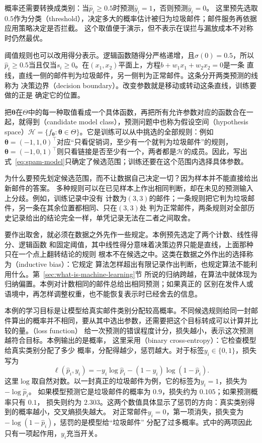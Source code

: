 概率还需要转换成类别：当$\hat{p}_i\geq 0.5$时预测$\hat{y}_i=1$，否则预测$\hat{y}_i=0$。
这里预先选取$0.5$作为分类（threshold），决定多大的概率估计被归为垃圾邮件；邮件服务再依据应用策略决定是否拦截。
这个取值便于演示，但不表示在误拦与漏放成本不对称时仍然最优。

阈值规则也可以改用得分表示。逻辑函数随得分严格递增，且$\sigma(0)=0.5$，所以
$\hat{p}_i\geq 0.5$当且仅当$s_i\geq 0$。在$(x_1,x_2)$平面上，方程$b+w_1x_1+w_2x_2=0$是一条
直线，直线一侧的邮件判为垃圾邮件，另一侧判为正常邮件。这条分开两类预测的线称为
决策边界（decision boundary）。改变参数就是移动或转动这条直线，训练要做的正是
确定它的位置。

把$\bm{\theta}$在$\Theta$中的每一种取值看成一个具体函数，再把所有允许参数对应的函数合在一起，就得到（candidate model class），预测问题中也称为假设空间（hypothesis space）$\mathcal{H}=\{f_{\bm{\theta}}:\bm{\theta}\in\Theta\}$。它是训练可以从中挑选的全部规则：例如$\bm{\theta}=(-1,1,0)^{\top}$对应“只看促销词，至少有一个就判为垃圾邮件”的规则，$\bm{\theta}=(-1,0,1)^{\top}$则只看链接是否至少有一个，两者都是$\mathcal{H}$的成员。因此，写出式~\eqref{eq:spam-model}只确定了候选范围；训练还要在这个范围内选择具体参数。

为什么要预先划定候选范围，而不让数据自己决定一切？因为样本并不能直接给出新邮件的答案。
多种规则可以在已见样本上作出相同判断，却在未见的预测输入上分歧。例如，训练记录中没有
计数为$(3,3)$的邮件；一条规则把它判为垃圾邮件，另一条在其余位置都相同、只在$(3,3)$处
判为正常邮件，两条规则对全部历史记录给出的结论完全一样，单凭记录无法在二者之间取舍。

要作出取舍，就必须在数据之外先作一些规定。本例预先选定了两个计数、线性得分、逻辑函数
和固定阈值，其中线性得分意味着决策边界只能是直线，上面那种只在一个点上翻转结论的规则
根本不在候选之中。这类在数据之外作出的选择称为（inductive bias）：它规定
算法怎样超出有限记录作出判断，也规定算法不能利用什么。第~\ref{sec:what-is-machine-learning}节
所说的归纳跨越，在算法中就体现为归纳偏置。本例对计数相同的邮件总给出相同预测；如果真正的
区别在发件人或语境中，再怎样调整权重，也不能恢复表示时已经舍去的信息。

本例的学习目标是让模型给真实邮件类别分配较高概率。不同候选规则给同一封邮件算出的概率并不相同，要从其中选出参数，还需要把这个目标转成可以计算并比较的量。（loss function）
给一次预测的错误程度计分，损失越小，表示这次预测越符合目标。本例输出的是概率，
这里采用（binary cross-entropy）：它检查模型给真实类别分配了多少
概率，分配得越少，惩罚越大。对于标签$y_i\in\{0,1\}$，损失写为
\begin{equation}
  \ell(\hat{p}_i,y_i)
  =-y_i\log\hat{p}_i-(1-y_i)\log(1-\hat{p}_i).
  \label{eq:binary-cross-entropy}
\end{equation}
这里$\log$取自然对数。以一封真正的垃圾邮件为例，它的标签为$y_i=1$，损失为$-\log\hat{p}_i$。
如果模型预测它是垃圾邮件的概率为 $0.9$，损失约为 $0.105$；如果预测概率只有 $0.1$，
损失则约为 $2.303$。这两个数值具体显示了惩罚的方向：真实类别得到的概率越小，交叉熵损失越大。
对正常邮件$y_i=0$，第一项消失，损失变为$-\log(1-\hat{p}_i)$，惩罚的是模型给“垃圾邮件”
分配了过多概率。式中的两项因此只有一项起作用，$y_i$充当开关。


